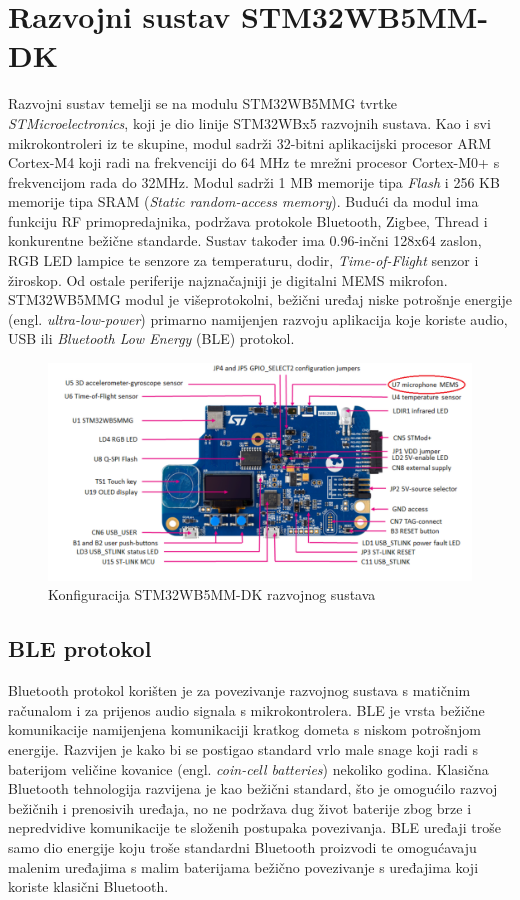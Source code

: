 \chapter{Razvojni sustav STM32WB5MM-DK}

Razvojni sustav temelji se na modulu STM32WB5MMG tvrtke \textit{STMicroelectronics}, koji je dio linije STM32WBx5 razvojnih sustava. Kao i svi mikrokontroleri iz te skupine, modul sadrži 32-bitni aplikacijski procesor ARM Cortex-M4 koji radi na frekvenciji do 64 MHz te mrežni procesor Cortex-M0+ s frekvencijom rada do 32MHz. Modul sadrži 1 MB memorije tipa \textit{Flash} i 256 KB memorije tipa SRAM (\textit{Static random-access memory}). Budući da modul ima funkciju RF primopredajnika, podržava protokole Bluetooth, Zigbee, Thread i konkurentne bežične standarde. Sustav također ima 0.96-inčni 128x64 zaslon, RGB LED lampice te senzore za temperaturu, dodir, \textit{Time-of-Flight} senzor i žiroskop. Od ostale periferije najznačajniji je digitalni MEMS mikrofon. STM32WB5MMG modul je višeprotokolni, bežični uređaj niske potrošnje energije (engl. \textit{ultra-low-power}) primarno namijenjen razvoju aplikacija koje koriste audio, USB ili \textit{Bluetooth Low Energy} (BLE) protokol. 

\begin{figure}[ht]
	\includegraphics[width=\linewidth]{imgs/discovery_kit}
	\caption{Konfiguracija STM32WB5MM-DK razvojnog sustava}
	\label{fig:discovery-kit}
\end{figure}

\section{BLE protokol}

Bluetooth protokol korišten je za povezivanje razvojnog sustava s matičnim računalom i za prijenos audio signala s mikrokontrolera. BLE je vrsta bežične komunikacije namijenjena komunikaciji kratkog dometa s niskom potrošnjom energije. Razvijen je kako bi se postigao standard vrlo male snage koji radi s baterijom veličine kovanice (engl. \textit{coin-cell batteries}) nekoliko godina.
Klasična Bluetooth tehnologija razvijena je kao bežični standard, što je omogućilo razvoj bežičnih i prenosivih uređaja, no ne podržava dug život baterije zbog brze i nepredvidive komunikacije te složenih postupaka povezivanja. BLE uređaji troše samo dio energije koju troše standardni Bluetooth proizvodi te omogućavaju malenim uređajima s malim baterijama bežično povezivanje s uređajima koji koriste klasični Bluetooth.


